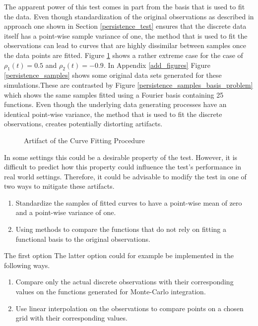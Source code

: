 \documentclass[12pt, a4paper]{article}
\theoremstyle{MAstyle} \newtheorem{assumption}{Assumption}[section]
\theoremstyle{MAstyle} \newtheorem{definition}{Definition}[section]
\theoremstyle{MAstyle} \newtheorem{theorem}{Theorem}[section]
\begin{document}
		The apparent power of this test comes in part from the basis that is used to fit the data. Even though standardization of the original observations as described in approach one shown in Section \ref{persistence_test} ensures that the discrete data itself has a point-wise sample variance of one, the method that is used to fit the observations can lead to curves that are highly dissimilar between samples once the data points are fitted. 
		Figure \ref{curve_fitting_artefact} shows a rather extreme case for the case of $\rho_1(t) = 0.5$ and $\rho_2(t) = -0.9$. In Appendix \ref{add_figures} Figure \ref{persistence_samples} shows some original data sets generated for these simulations.These are contrasted by Figure \ref{persistence_samples_basis_problem} which shows the same samples fitted using a Fourier basis containing 25 functions. 
		Even though the underlying data generating processes have an identical point-wise variance, the method that is used to fit the discrete observations, creates potentially distorting artifacts.
		\begin{figure}[H]
		\caption{Artifact of the Curve Fitting Procedure}
		\label{curve_fitting_artefact}
		\end{figure}
		In some settings this could be a desirable property of the test. However, it is difficult to predict how this property could influence the test's performance in real world settings. Therefore, it could be advisable to modify the test in one of two ways to mitigate these artifacts.
		\begin{enumerate}
			\item Standardize the samples of fitted curves to have a point-wise mean of zero and a point-wise variance of one.
			\item Using methods to compare the functions that do not rely on fitting a functional basis to the original observations.
		\end{enumerate}
		The first option 
		The latter option could for example be implemented in the following ways.
		\begin{enumerate}
			\item Compare only the actual discrete observations with their corresponding values on the functions generated for Monte-Carlo integration.
			\item Use linear interpolation on the observations to compare points on a chosen grid with their corresponding values.
		\end{enumerate} 
\end{document}
